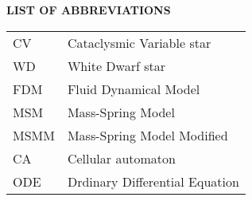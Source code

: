 \newpage
{}
{}
\noindent \Large \textbf{LIST OF ABBREVIATIONS}
\normalsize

\vspace{1cm}

\begin{center}
\def\arraystretch{1.5}%
\setlength\tabcolsep{1cm}
\begin{tabular}{ll}

CV			& Cataclysmic Variable star \\
WD			& White Dwarf star \\
FDM			& Fluid Dynamical Model \\
MSM			& Mass-Spring Model \\
MSMM			& Mass-Spring Model Modified \\
CA			& Cellular automaton \\
ODE			& Drdinary Differential Equation

\end{tabular}
\end{center}
